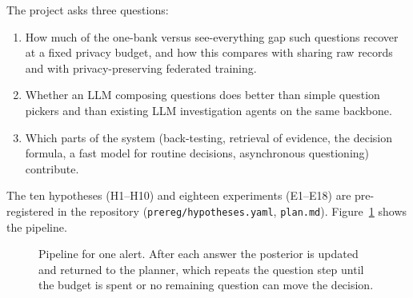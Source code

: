 \documentclass[11pt,a4paper]{article}
\newcommand{\eps}{\varepsilon}
\begin{document}
The project asks three questions:
\begin{enumerate}
\item How much of the one-bank versus see-everything gap such questions recover at a fixed privacy budget, and how this compares with sharing raw records and with privacy-preserving federated training.
\item Whether an LLM composing questions does better than simple question pickers and than existing LLM investigation agents on the same backbone.
\item Which parts of the system (back-testing, retrieval of evidence, the decision formula, a fast model for routine decisions, asynchronous questioning) contribute.
\end{enumerate}
The ten hypotheses (H1--H10) and eighteen experiments (E1--E18) are pre-registered in the repository (\texttt{prereg/hypotheses.yaml}, \texttt{plan.md}). Figure~\ref{fig:arch} shows the pipeline.

\begin{figure}[h]
\centering
{}
\caption{Pipeline for one alert. After each answer the posterior is updated and returned to the planner, which repeats the question step until the budget is spent or no remaining question can move the decision.}
\label{fig:arch}
\end{figure}
\end{document}
